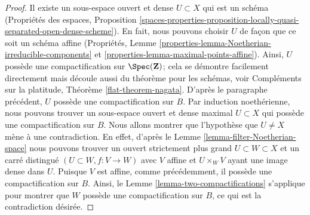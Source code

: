 \begin{proof}
\medskip\noindent
Il existe un sous-espace ouvert et dense $U \subset X$ qui est un schéma
(Propriétés des espaces, Proposition \ref{spaces-properties-proposition-locally-quasi-separated-open-dense-scheme}).
En fait, nous pouvons choisir $U$ de façon que ce soit un schéma affine
(Propriétés, Lemme \ref{properties-lemma-Noetherian-irreducible-components} et \ref{properties-lemma-maximal-points-affine}).
Ainsi, $U$ possède une compactification sur $\Spec(\mathbf{Z})$;
cela se démontre facilement directement mais découle aussi du
théorème pour les schémas, voir
Compléments sur la platitude, Théorème \ref{flat-theorem-nagata}.
D'après le paragraphe précédent, $U$ possède une compactification sur $B$.
Par induction noethérienne, nous pouvons trouver un sous-espace ouvert et dense maximal
$U \subset X$ qui possède une compactification sur $B$. Nous allons montrer
que l'hypothèse que $U \not = X$ mène à une contradiction.
En effet, d'après le Lemme \ref{lemma-filter-Noetherian-space}
nous pouvons trouver un ouvert strictement plus grand $U \subset W \subset X$ et un carré distingué $(U \subset W, f : V \to W)$ avec $V$ affine et $U \times_W V$ ayant une image dense dans $U$. Puisque $V$ est affine, comme précédemment, il possède une compactification sur $B$. Ainsi, le Lemme \ref{lemma-two-compactifications} s'applique pour montrer que $W$ possède une compactification sur $B$, ce qui est la contradiction désirée. 
\end{proof}












